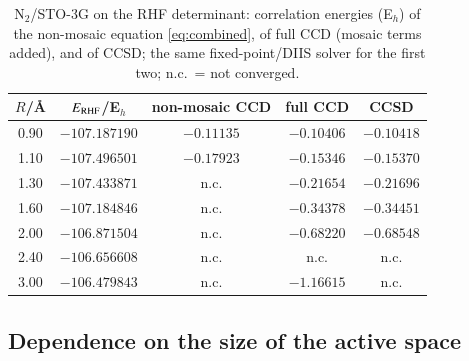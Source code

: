 \documentclass[aip,jcp,reprint,noshowkeys,superscriptaddress]{revtex4-1}
\begin{document}
\begin{table}[t]
\caption{N$_2$/STO-3G on the RHF determinant: correlation energies (E$_h$)
of the non-mosaic equation \eqref{eq:combined}, of full CCD (mosaic terms
added), and of CCSD; the same fixed-point/DIIS solver for the first two;
n.c.\ = not converged.}
\label{tab:mosaic}
\begin{ruledtabular}
\begin{tabular}{ccccc}
$R$/\AA & $E_{\rm RHF}$/E$_h$ & non-mosaic CCD & full CCD & CCSD\\
\hline
0.90 & $-107.187190$ & $-0.11135$ & $-0.10406$ & $-0.10418$\\
1.10 & $-107.496501$ & $-0.17923$ & $-0.15346$ & $-0.15370$\\
1.30 & $-107.433871$ & n.c. & $-0.21654$ & $-0.21696$\\
1.60 & $-107.184846$ & n.c. & $-0.34378$ & $-0.34451$\\
2.00 & $-106.871504$ & n.c. & $-0.68220$ & $-0.68548$\\
2.40 & $-106.656608$ & n.c. & n.c. & n.c.\\
3.00 & $-106.479843$ & n.c. & $-1.16615$ & n.c.\\
\end{tabular}
\end{ruledtabular}
\end{table}

\subsection{Dependence on the size of the active space}
\label{sec:active-size}
\end{document}
